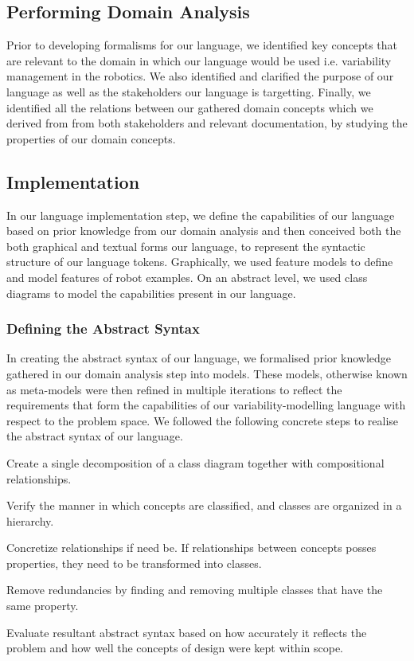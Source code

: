 \documentclass[conference]{IEEEtran}
\begin{document}
\subsection{Performing Domain Analysis}
Prior to developing formalisms for our language, we identified key concepts that are relevant to the domain in which our language would be used i.e. variability management in the robotics. We also identified and clarified the purpose of our language as well as the stakeholders our language is targetting. Finally, we identified all the relations between our gathered domain concepts which we derived from  from both stakeholders and relevant documentation, by studying the properties of our domain concepts.

\subsection{Implementation}
In our language implementation step, we define the capabilities of our language based on prior knowledge from our domain analysis and then conceived both the both graphical and textual forms our language, to represent the syntactic structure of our language tokens. Graphically, we used feature models to define and model features of robot examples. On an abstract level, we used class diagrams to model the capabilities present in our language.

\subsubsection{Defining the Abstract Syntax}
In creating the abstract syntax of our language, we formalised prior knowledge gathered in our domain analysis step into models. These models, otherwise known as meta-models were then refined in multiple iterations to reflect the requirements that form the capabilities of our variability-modelling language with respect to the problem space. We followed the following concrete steps to realise the abstract syntax of our language.\begin{enumerate*}
    \item Create a single decomposition of a class diagram together with compositional relationships.
    \item Verify the manner in which concepts are classified, and classes are organized in a hierarchy.
    \item Concretize relationships if need be. If relationships between concepts posses properties, they need to be transformed into classes.
    \item Remove redundancies by finding and removing multiple classes that have the same property.
    \item Evaluate resultant abstract syntax based on how accurately it reflects the problem and how well the concepts of design were kept within scope.
\end{enumerate*}
\end{document}
